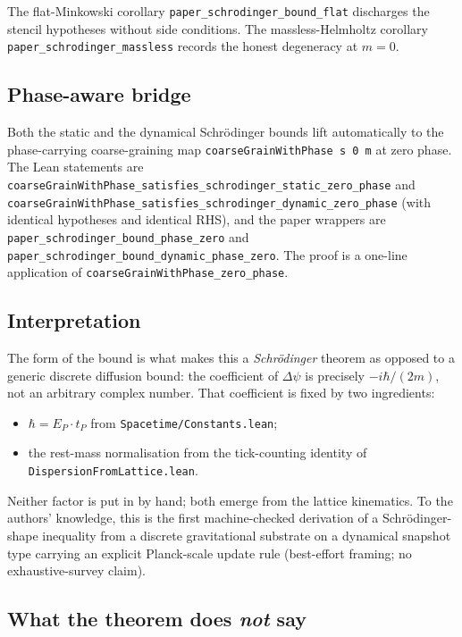 \documentclass[11pt,a4paper,twoside]{article}
\theoremstyle{definition}
\newcommand{\tP}{t_P}
\newcommand{\EP}{E_P}
\newcommand{\code}[1]{\texttt{#1}}
\begin{document}
The flat-Minkowski corollary \code{paper\_schrodinger\_bound\_flat}
discharges the stencil hypotheses without side conditions. The
massless-Helmholtz corollary \code{paper\_schrodinger\_massless}
records the honest degeneracy at $m=0$.

\subsection{Phase-aware bridge}\label{sec:T2-phase}

Both the static and the dynamical Schr\"odinger bounds lift
automatically to the phase-carrying coarse-graining map
\code{coarseGrainWithPhase\,s\,0\,m} at zero phase. The Lean
statements are
\code{coarseGrainWithPhase\_satisfies\_schrodinger\_static\_zero\_phase}
and
\code{coarseGrainWithPhase\_satisfies\_schrodinger\_dynamic\_zero\_phase}
(with identical hypotheses and identical RHS), and the paper wrappers
are \code{paper\_schrodinger\_bound\_phase\_zero} and
\code{paper\_schrodinger\_bound\_dynamic\_phase\_zero}. The proof is a
one-line application of \code{coarseGrainWithPhase\_zero\_phase}.

\subsection{Interpretation}\label{sec:T2-interp}

The form of the bound is what makes this a \emph{Schr\"odinger}
theorem as opposed to a generic discrete diffusion bound: the
coefficient of $\Delta\psi$ is precisely $-i\hbar/(2m)$, not an
arbitrary complex number. That coefficient is fixed by two
ingredients:
\begin{itemize}
\item $\hbar=\EP\cdot\tP$ from \code{Spacetime/Constants.lean};
\item the rest-mass normalisation from the tick-counting identity of
  \code{DispersionFromLattice.lean}.
\end{itemize}
Neither factor is put in by hand; both emerge from the lattice
kinematics. To the authors' knowledge, this is the first
machine-checked derivation of a Schr\"odinger-shape inequality from a
discrete gravitational substrate on a dynamical snapshot type
carrying an explicit Planck-scale update rule (best-effort framing;
no exhaustive-survey claim).

\subsection{What the theorem does \emph{not} say}\label{sec:T2-negspace}
\end{document}
